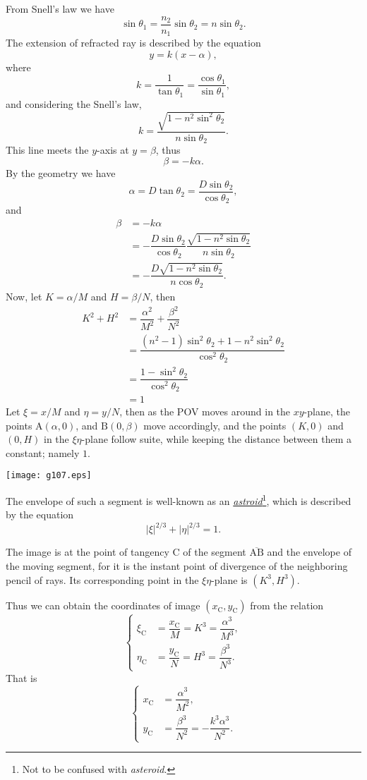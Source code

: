 \documentclass[twocolumn]{article}
\begin{document}
From Snell's law we have
$$ \sin\theta_1 = \frac{n_2}{n_1} \sin\theta_2 = n\sin\theta_2.$$
The extension of refracted ray is described by the equation 
$$y=k(x-\alpha),$$
where 
$$k=\dfrac{1}{\tan\theta_1}=\dfrac{\cos\theta_1}{\sin\theta_1},$$
and considering the Snell's law,
$$k=\dfrac{\sqrt{1-n^2\sin^2\theta_2}}{n\sin\theta_2}.$$
This line meets the $y$-axis at $y=\beta$, thus
$$\beta = -k\alpha.$$
By the geometry we have
$$\alpha = D\tan\theta_2 = \dfrac{D\sin\theta_2}{\cos\theta_2},$$
and
$$\begin{aligned}
	\beta &= -k\alpha \\
	&= -\dfrac{D\sin\theta_2}{\cos\theta_2}
	\dfrac{\sqrt{1-n^2\sin\theta_2}}{n\sin\theta_2}\\
	&=-\dfrac{D\sqrt{1-n^2\sin\theta_2}}{n\cos\theta_2}.
\end{aligned}$$
Now, let $K=\alpha/M$ and $H=\beta/N$, then
$$ \begin{aligned}
	K^2 + H^2 &= \dfrac{\alpha^2}{M^2}+\dfrac{\beta^2}{N^2}\\
	&=\dfrac{\left(n^2-1\right)\sin^2\theta_2 + 1-n^2\sin^2\theta_2}
	{\cos^2\theta_2}\\
	&=\dfrac{1-\sin^2\theta_2}{\cos^2\theta_2}\\
	&=1
\end{aligned}$$
Let $\xi=x/M$ and $\eta=y/N$, then as the POV moves around in the $xy$-plane,
the points $\mathrm{A}(\alpha, 0)$, and $\mathrm{B}(0, \beta)$ move accordingly,  
and the points $(K, 0)$ and $(0, H)$ in the $\xi\eta$-plane follow suite, 
while keeping the distance between them a constant; namely $1$.

\texttt{[image: g107.eps]}

The envelope of such a segment is well-known as an \href{https://en.wikipedia.org/wiki/Astroid}{\emph{astroid}}\footnote{Not 
to be confused with {\emph{asteroid}}.}, which is described by the 
equation
$$ \left| \xi \right|^{2/3} + \left| \eta \right|^{2/3} = 1. $$

The image is at the point of tangency $\mathrm{C}$ of the segment 
$\overline{\mathrm{AB}}$ and the envelope of the moving segment, for 
it is the instant point of divergence of the neighboring pencil of rays.
Its corresponding point in the $\xi\eta$-plane is $(K^3, H^3)$.

Thus we can obtain the coordinates of image $(x_{\mathrm{C}}^{}, y_{\mathrm{C}}^{})$ 
from the relation
$$ \left\{ 
\begin{aligned}
	\xi_{\mathrm{C}}^{} &= \dfrac{x_{\mathrm{C}}^{}}{M} = K^3 = \dfrac{\alpha^3}{M^3},\\
	\eta_{\mathrm{C}}^{} &= \dfrac{y_{\mathrm{C}}^{}}{N} = H^3 = \dfrac{\beta^3}{N^3}.
\end{aligned}
\right.$$
That is
$$ \left\{ 
\begin{aligned}
	x_{\mathrm{C}}^{} &= \dfrac{\alpha^3}{M^2},\\
	y_{\mathrm{C}}^{} &= \dfrac{\beta^3}{N^2}=-\dfrac{k^3\alpha^3}{N^2}.
\end{aligned}
\right.$$
\end{document}
